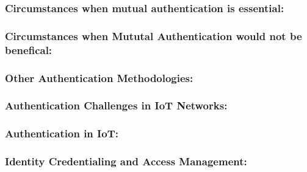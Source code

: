 \documentclass[lnicst,sechang,a4paper]{svmultln}
\begin{document}
\subsubsection{Circumstances when mutual authentication is essential:}
\subsubsection{Circumstances when Mututal Authentication would not be benefical:}
\subsubsection{Other Authentication Methodologies:}
\subsubsection{Authentication Challenges in IoT Networks:}
\subsubsection{Authentication in IoT:}
\subsubsection{Identity Credentialing and Access Management:}

\begin{thebibliography}{4}






\end{thebibliography}
\end{document}
